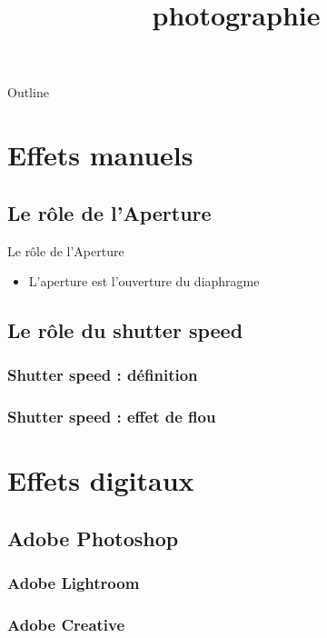 \documentclass{beamer}
\title{ photographie }
\begin{document}
 

 
 \begin{frame} 
   \titlepage 
 \end{frame} 
 
 \begin{frame}{Outline} 
 \tableofcontents 
 \end{frame} 

\section{ Effets manuels } 
\subsection{Le rôle de l'Aperture} 

  \begin{frame}{Le rôle de l'Aperture}{} 

     \begin{itemize} 
      \item { 
         L'aperture est l'ouverture du diaphragme 
      } 
   \end{itemize} 
 \end{frame}

\subsection{Le rôle du shutter speed} 

\subsubsection{Shutter speed : définition} 

\subsubsection{Shutter speed : effet de flou} 

\section{ Effets digitaux } 
\subsection{Adobe Photoshop} 

\subsubsection{Adobe Lightroom} 

\subsubsection{Adobe Creative} 
\end{document}
